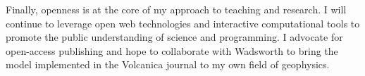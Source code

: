 \documentclass[12pt,notitlepage]{article}
\begin{document}
Finally, openness is at the core of my approach to teaching and research.
I will continue to leverage open web technologies and interactive computational tools to
promote the public understanding of science and programming.
I advocate for open-access publishing and hope to collaborate with Wadsworth to bring
the model implemented in the Volcanica journal to my own field of geophysics.
\end{document}
